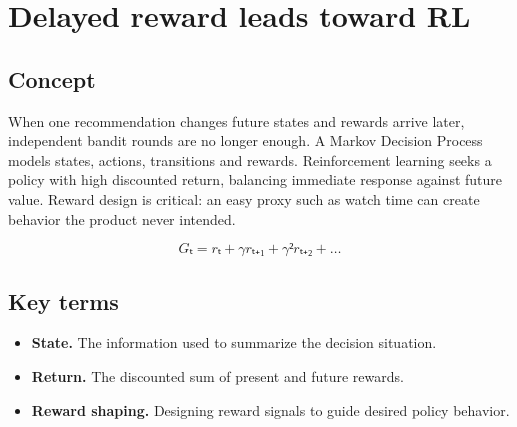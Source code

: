 \section{Delayed reward leads toward RL}

\begin{abstract}
A click is immediate; trust, retention and habit unfold across many decisions.
\end{abstract}

\subsection{Concept}
When one recommendation changes future states and rewards arrive later, independent bandit rounds are no longer enough. A Markov Decision Process models states, actions, transitions and rewards. Reinforcement learning seeks a policy with high discounted return, balancing immediate response against future value. Reward design is critical: an easy proxy such as watch time can create behavior the product never intended.

\begin{equation*}
Gₜ = rₜ + γrₜ₊₁ + γ²rₜ₊₂ + …
\end{equation*}

\subsection{Key terms}
\begin{itemize}
\item \textbf{State.} The information used to summarize the decision situation.
\item \textbf{Return.} The discounted sum of present and future rewards.
\item \textbf{Reward shaping.} Designing reward signals to guide desired policy behavior.
\end{itemize}
